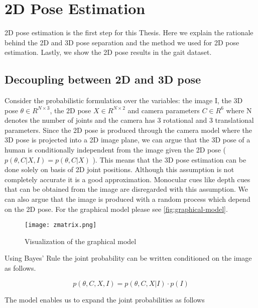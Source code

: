 
\chapter{2D Pose Estimation}\label{chapter:2dpose}

2D pose estimation is the first step for this Thesis. Here we explain the rationale behind the 2D and 3D pose separation and the method we used for 2D pose estimation. Lastly, we show the 2D pose results in the gait dataset. 

\section{Decoupling between 2D and 3D pose}

Consider the probabilistic formulation over the variables: the image I, the 3D pose $ \theta \in R^{N\times3} $, the 2D pose $X \in R^{N\times2}$ and camera parameters $ C \in R^{6} $ where N denotes the number of joints and the camera has 3 rotational and 3 translational parameters. Since the 2D pose is produced through the camera model where the 3D pose is projected into a 2D image plane, we can argue that the 3D pose of a human is conditionally independent from the image given the 2D pose ( $p(\theta,C|X,I) = p(\theta,C|X)$ ). This means that the 3D pose estimation can be done solely on basis of 2D joint positions. Although this assumption is not completely accurate it is a good approximation. Monocular cues like depth cues that can be obtained from the image are disregarded with this assumption. We can also argue that the image is produced with a random process which depend on the 2D pose. For the graphical model please see \autoref{fig:graphical-model}.

\begin{figure}[htpb]
    \texttt{[image: zmatrix.png]}
    \caption{Visualization of the graphical model}
    \label{fig:graphical-model}
\end{figure}

Using Bayes' Rule the joint probability can be written conditioned on the image as follows.

\begin{equation}
    p(\theta,C,X,I) = p(\theta,C,X|I) \cdot p(I)
\end{equation}

The model enables us to expand the joint probabilities as follows

